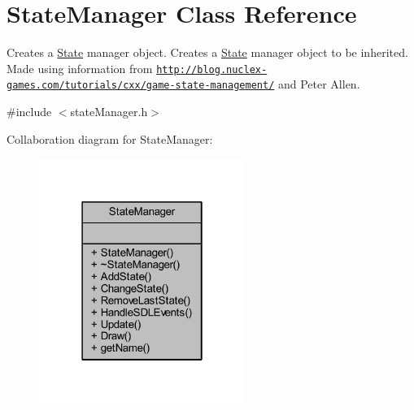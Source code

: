 \hypertarget{class_state_manager}{\section{State\+Manager Class Reference}
\label{class_state_manager}
}


Creates a \hyperlink{class_state}{State} manager object. Creates a \hyperlink{class_state}{State} manager object to be inherited. Made using information from \href{http://blog.nuclex-games.com/tutorials/cxx/game-state-management/}{\tt http\+://blog.\+nuclex-\/games.\+com/tutorials/cxx/game-\/state-\/management/} and Peter Allen.  




{\ttfamily \#include $<$state\+Manager.\+h$>$}



Collaboration diagram for State\+Manager\+:
\nopagebreak
\begin{figure}[H]
\begin{center}
\leavevmode
\includegraphics[width=190pt]{class_state_manager__coll__graph}
\end{center}
\end{figure}
